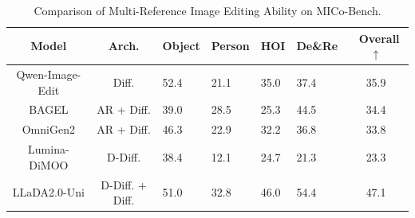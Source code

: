 \begin{table}[!tb]
\centering
\renewcommand{\arraystretch}{1.2}
\setlength\tabcolsep{3pt}
\small
{}

\caption{Comparison of Multi-Reference Image Editing Ability on MICo-Bench.}
\begin{tabularx}{\linewidth}{cc| *{4}{C}|c} 
\toprule

\textbf{Model} & \textbf{Arch.} & \textbf{Object} &\textbf{Person} &\textbf{HOI} &\textbf{De\&Re} &\textbf{~Overall$\uparrow$} \\

\midrule
Qwen-Image-Edit & Diff. & 52.4  & 21.1 & 35.0 & 37.4 & 35.9 \\

BAGEL & AR + Diff. & 39.0 & 28.5 & 25.3 & 44.5 & 34.4 \\

OmniGen2 & AR + Diff. & 46.3 & 22.9 & 32.2 & 36.8 & 33.8 \\

Lumina-DiMOO & D-Diff. & 38.4 & 12.1 & 24.7 & 21.3 & 23.3 \\

LLaDA2.0-Uni &D-Diff. + Diff. &51.0 &32.8 &46.0 &54.4 &47.1  \\
\bottomrule
\end{tabularx}
\label{table:mico-bench}
\vspace{-0.15in}
\end{table}